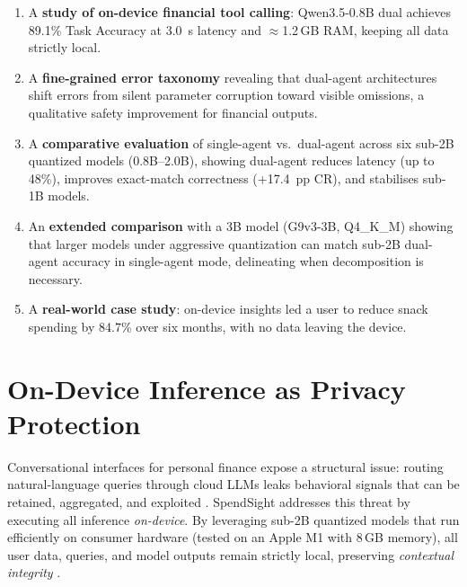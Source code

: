\documentclass[11pt,twocolumn]{article}
\begin{document}
\begin{enumerate}
    \item A \textbf{study of on-device financial tool calling}:
          Qwen3.5-0.8B dual achieves 89.1\% Task Accuracy at
          3.0~s latency and $\approx$1.2\,GB RAM, keeping all
          data strictly local.

    \item A \textbf{fine-grained error taxonomy} revealing that
          dual-agent architectures shift errors from silent
          parameter corruption toward visible omissions, a
          qualitative safety improvement for financial outputs.

    \item A \textbf{comparative evaluation} of single-agent
          vs.\ dual-agent across six sub-2B quantized models
          (0.8B--2.0B), showing dual-agent reduces latency
          (up to 48\%), improves exact-match correctness
          (+17.4~pp CR), and stabilises sub-1B models.

    \item An \textbf{extended comparison} with a 3B model
          (G9v3-3B, Q4\_K\_M) showing that larger models under
          aggressive quantization can match sub-2B dual-agent
          accuracy in single-agent mode, delineating when
          decomposition is necessary.

    \item A \textbf{real-world case study}: on-device insights
          led a user to reduce snack spending by 84.7\% over
          six months, with no data leaving the device.
\end{enumerate}

\section{On-Device Inference as Privacy Protection}
\label{sec:privacy}

Conversational interfaces for personal finance expose a structural issue: routing natural-language queries through cloud LLMs leaks behavioral signals that can be retained, aggregated, and exploited \citep{staab2024memorization, yao2024survey}.
SpendSight addresses this threat by executing all inference \emph{on-device}. By leveraging sub-2B quantized models that run efficiently on consumer hardware (tested on an Apple M1 with 8\,GB memory), all user data, queries, and model outputs remain strictly local, preserving \emph{contextual integrity} \citep{nissenbaum2004privacy}.
\end{document}
